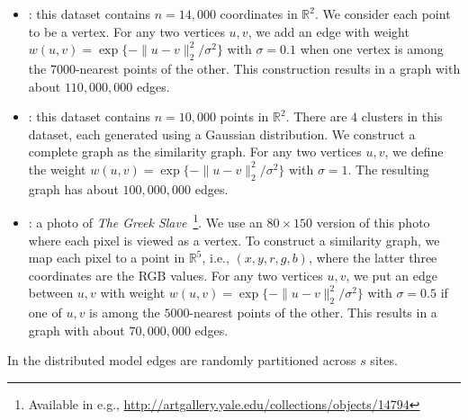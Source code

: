 \vspace{-1mm}
\begin{itemize}
\item \twomoons : this dataset contains $n=14,000$ coordinates in $\mathbb{R}^2$. We consider each point to be a vertex. For any two vertices $u, v$, we add an edge with weight $w(u,v) = \exp\{-\|u-v\|_2^2/\sigma^2\}$ with $\sigma = 0.1$ when one vertex is among the $7000$-nearest points of the other.  This construction results in a graph with about $110,000,000$ edges.

\item  \gauss : this dataset contains $n = 10,000$ points in $\mathbb{R}^2$. There are $4$ clusters in this dataset, each generated using a Gaussian distribution. We construct a complete graph as the similarity graph.  For any two vertices $u, v$, we define the weight $w(u,v) = \exp\{-\|u-v\|_2^2/\sigma^2\}$ with $\sigma = 1$. The resulting graph has about $100,000,000$ edges.

\item \sculpture : a photo of \textit{The Greek Slave}~\footnote{Available in e.g., \url{http://artgallery.yale.edu/collections/objects/14794}}. We use an $80\times 150$ version of this photo where each pixel is viewed as a vertex. To construct a similarity graph, we map each pixel to a point in $\mathbb{R}^5$, i.e., $(x, y, r, g, b)$, where the latter three coordinates are the RGB values. For any two vertices $u, v$, we  put an edge between $u, v$ with weight $w(u,v) = \exp\{-\|u-v\|_2^2/\sigma^2\}$ with $\sigma = 0.5$ if one of $u, v$ is among the $5000$-nearest points of the other. This results in a graph with about $70,000,000$ edges.
\end{itemize}
\vspace{-1mm}
In the distributed model edges are randomly partitioned across $s$ sites. 




